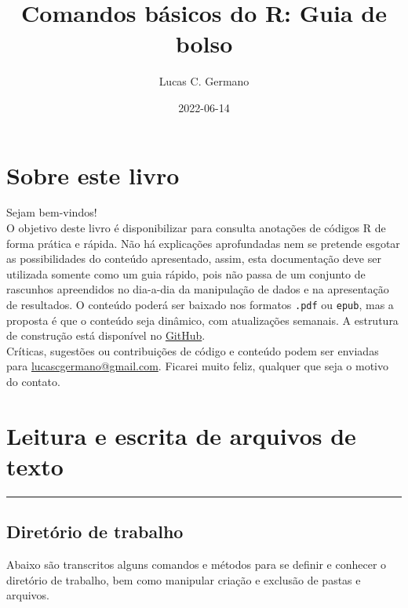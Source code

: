 \documentclass[
]{book}
\title{Comandos básicos do R: Guia de bolso}
\author{Lucas C. Germano}
\date{2022-06-14}
\theoremstyle{definition}
\theoremstyle{definition}
\theoremstyle{definition}
\theoremstyle{definition}
\theoremstyle{remark}
\begin{document}
\maketitle

{
\setcounter{tocdepth}{1}
\tableofcontents
}
\hypertarget{sobre-este-livro}{%
\chapter*{Sobre este livro}\label{sobre-este-livro}}

Sejam bem-vindos!\\
O objetivo deste livro é disponibilizar para consulta anotações de códigos R de forma prática e rápida. Não há explicações aprofundadas nem se pretende esgotar as possibilidades do conteúdo apresentado, assim, esta documentação deve ser utilizada somente como um guia rápido, pois não passa de um conjunto de rascunhos apreendidos no dia-a-dia da manipulação de dados e na apresentação de resultados. O conteúdo poderá ser baixado nos formatos \texttt{.pdf} ou \texttt{epub}, mas a proposta é que o conteúdo seja dinâmico, com atualizações semanais. A estrutura de construção está disponível no \href{https://github.com/lucascgmermano/guia_de_bolso.git}{GitHub}.\\
Críticas, sugestões ou contribuições de código e conteúdo podem ser enviadas para \url{lucascgermano@gmail.com}. Ficarei muito feliz, qualquer que seja o motivo do contato.

\hypertarget{leitura-e-escrita-de-arquivos-de-texto}{%
\chapter{Leitura e escrita de arquivos de texto}\label{leitura-e-escrita-de-arquivos-de-texto}}

\begin{center}\rule{0.5\linewidth}{0.5pt}\end{center}

\hypertarget{diretuxf3rio-de-trabalho}{%
\section{Diretório de trabalho}\label{diretuxf3rio-de-trabalho}}

Abaixo são transcritos alguns comandos e métodos para se definir e conhecer o diretório de trabalho, bem como manipular criação e exclusão de pastas e arquivos.
\end{document}
